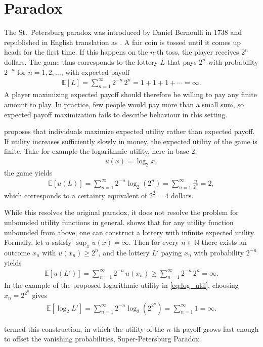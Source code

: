 \section{Paradox}

The St.\ Petersburg paradox was introduced by Daniel Bernoulli in 1738 and republished in English translation as \citet{bernoulli1954exposition}.
A fair coin is tossed until it comes up heads for the first time.
If this happens on the $n$-th toss, the player receives $2^n$ dollars.
The game thus corresponds to the lottery $L$ that pays $2^n$ with probability $2^{-n}$ for $n = 1, 2, \ldots$, with expected payoff
\begin{align*}
    \mathbb{E}[L] = \sum_{n=1}^{\infty} 2^{-n} \, 2^n = 1 + 1 + 1 + \cdots = \infty.
\end{align*}
A player maximizing expected payoff should therefore be willing to pay any finite amount to play.
In practice, few people would pay more than a small sum, so expected payoff maximization fails to describe behaviour in this setting.

\citet{bernoulli1954exposition} proposes that individuals maximize expected utility rather than expected payoff.
If utility increases sufficiently slowly in money, the expected utility of the game is finite.
Take for example the logarithmic utility, here in base 2,
\begin{align}\label{eq:log_util}
    u(x) = \log_{2} x,
\end{align}
the game yields
\begin{align*}
    \mathbb{E}[u(L)] = \sum_{n=1}^{\infty} 2^{-n} \log_2\!\left(2^n\right) = \sum_{n=1}^{\infty} \frac{n}{2^n} = 2,
\end{align*}
which corresponds to a certainty equivalent of $2^2 = 4$ dollars.

While this resolves the original paradox, it does not resolve the problem for unbounded utility functions in general.
\citet{menger1934unbounded} shows that for any utility function unbounded from above, one can construct a lottery with infinite expected utility. Formally, let $u$ satisfy $\sup_x u(x) = \infty$.
Then for every $n \in \mathbb{N}$ there exists an outcome $x_n$ with $u(x_n) \geq 2^n$, and the lottery $L'$ paying $x_n$ with probability $2^{-n}$ yields
\begin{align*}
    \mathbb{E}[u(L')] = \sum_{n=1}^{\infty} 2^{-n} \, u(x_n) \geq \sum_{n=1}^{\infty} 2^{-n} \, 2^n = \infty.
\end{align*}
In the example of the proposed logarithmic utility in \eqref{eq:log_util}, choosing $x_n = 2^{2^n}$ gives
\begin{align*}
    \mathbb{E}[\log_2 L'] = \sum_{n=1}^{\infty} 2^{-n} \log_2\!\left(2^{2^n}\right) = \sum_{n=1}^{\infty} 1 = \infty.
\end{align*}

\citet{samuelson1977petersburg} termed this construction, in which the utility of the $n$-th payoff grows fast enough to offset the vanishing probabilities, Super-Petersburg Paradox.
